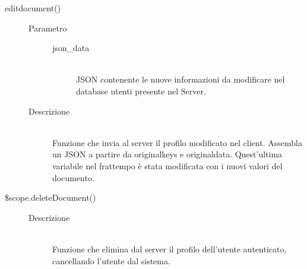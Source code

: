 \begin{description}
\begin{description}
  \item[edit\textunderscore document()] \hfill 
  \begin{description}
  	\item[Parametro] \hfill
  		\begin{description}
  			\item[json\_data] \hfill \\
  			JSON contenente le nuove informazioni da modificare nel database utenti presente nel Server.
       \end{description}
  	\item[Descrizione] \hfill \\
Funzione che invia al server il profilo modificato nel client.
  Assembla un JSON a partire da original\textunderscore keys e original\textunderscore data. Quest'ultima variabile nel frattempo è stata modificata con i nuovi valori del documento.
    \end{description}
  
  
\item[\$scope.deleteDocument()] \hfill
	 
	 \begin{description}
	 	\item[Descrizione] \hfill \\	 
  Funzione che elimina dal server il profilo dell'utente autenticato, cancellando l'utente dal sistema.
  	 \end{description}
 \end{description}
\end{description}

